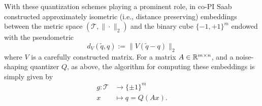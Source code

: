 With these quantization schemes playing a prominent role, in  \cite{huynh2018fast} co-PI Saab  constructed approximately isometric (i.e., distance preserving) embeddings between the metric space  $(\mathcal{T}, \|\cdot\|_2)$ and the binary  cube $\{-1,+1\}^m$ endowed with the pseudometric
$$d_{{V}}(\tilde{q},q) := \| {V}(\tilde{q} -{q}) \|_2$$
where $V$ is a carefully constructed matrix.
For a  matrix $A\in\mathbb{R}^{m\times n}$, and a noise-shaping quantizer $Q$, as above, the algorithm for computing these embeddings is simply given by \begin{align}
g: \mathcal{T} &\to \{\pm 1\}^m\nonumber\\
x &\mapsto q=Q(Ax).\nonumber
\end{align}

